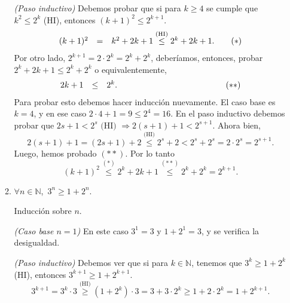 \begin{enumerate}
\begin{enumerate}
        \textit{(Paso inductivo)} Debemos probar que si para $k \ge 4$ se cumple  que  $k^2\leq 2^k$ (HI),  entonces $(k+1)^2\leq 2^{k+1}$. 
        \begin{equation*}
        \begin{array}{rclr}
        (k+1)^2 &=& k^2 + 2k +1 \overset{\text{(HI)}}{\le} 2^k +2k +1. \hfill &\quad \hfill(*)
        \end{array}
        \end{equation*}
        Por otro lado, $2^{k+1} = 2 \cdot 2^k = 2^k + 2^k$, deberíamos,  entonces,  probar $2^k +2k +1 \le 2^k +2^k$ o equivalentemente, 
        \begin{equation*}
        \begin{array}{rclr}
        2k +1   &\le&2^k. \hfill &\qquad\qquad\qquad\qquad\qquad\qquad \hfill\hfill(**)
        \end{array}
        \end{equation*}
        Para probar esto debemos hacer inducción nuevamente. El caso base es $k=4$, y en ese caso $2\cdot 4+ 1 = 9 \le 2^4 = 16$. En  el paso inductivo debemos probar que $2s+ 1 < 2^s \text{ (HI) } \Rightarrow 2(s+1)+ 1 < 2^{s+1}$. Ahora bien, 
        \begin{equation*}
        2(s+1)+ 1  = (2s + 1) +2 \overset{\text{(HI)}}{\le} 2^s + 2 < 2^s + 2^s = 2\cdot 2^s = 2^{s+1}. 
        \end{equation*}    
        Luego,  hemos probado $(**)$. Por lo tanto
        \begin{equation*}
        (k+1)^2 \overset{(*)}{\le}  2^k +2k +1 \overset{(**)}{\le} 2^k + 2^k = 2^{k+1}.
        \end{equation*}
        
        
        \item $\forall n \in {\mathbb N}$,\ $3^n \ge 1 + 2^n$.
        
        \rta Inducción sobre $n$.
        
        \textit{(Caso base $n=1$) } En este caso $3^1 = 3$ y $1+2^1 = 3$, y se verifica la desigualdad.
        
        \textit{(Paso inductivo)} Debemos ver que si para $k \in \mathbb N$, tenemos que   $3^{k} \ge 1 + 2^k$ (HI),  entonces $3^{k+1} \ge 1 + 2^{k+1}$. 
        \begin{equation*}
        3^{k+1} = 3^k\cdot 3 \overset{\text{(HI)}}{\ge} (1 + 2^k) \cdot 3 = 3 + 3 \cdot 2^k \ge 1 + 2\cdot 2^k = 1 + 2^{k+1}.
        \end{equation*}
        

\end{enumerate}
\end{enumerate}
